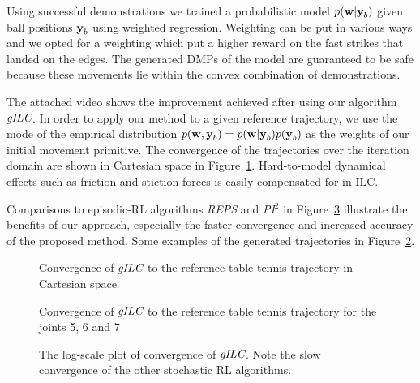 Using successful demonstrations we trained a probabilistic model $p(\boldsymbol{\mathrm{w}}|\boldsymbol{\mathrm{y}}_b)$ given ball positions $\boldsymbol{\mathrm{y}}_b$ using weighted regression. Weighting can be put in various ways and we opted for a weighting which put a higher reward on the fast strikes that landed on the edges. The generated DMPs of the model are guaranteed to be safe because these movements lie within the convex combination of demonstrations. 



The attached video shows the improvement achieved after using our algorithm $\emph{gILC}$. In order to apply our method to a given reference trajectory, we use the mode of the empirical distribution $p(\boldsymbol{\mathrm{w}},\boldsymbol{\mathrm{y}}_b) = p(\boldsymbol{\mathrm{w}}|\boldsymbol{\mathrm{y}}_b)p(\boldsymbol{\mathrm{y}}_b)$ as the weights of our initial movement primitive. The convergence of the trajectories over the iteration domain are shown in Cartesian space in Figure~\ref{ILCTrajectoryTTCartesian}. Hard-to-model dynamical effects such as friction and stiction forces is easily compensated for in ILC.

Comparisons to episodic-RL algorithms \emph{REPS} and \emph{PI$^{2}$} in Figure~\ref{ttComparison} illustrate the benefits of our approach, especially the faster convergence and increased accuracy of the proposed method. Some examples of the generated trajectories in Figure~\ref{ILCTrajectoryTT}. 

\begin{figure}
\center
\scalebox{1.0}{}
\caption{Convergence of $\emph{gILC}$ to the reference table tennis trajectory in Cartesian space.}
\label{ILCTrajectoryTTCartesian}
\end{figure}

\begin{figure}
\center
\scalebox{1.0}{}
\caption{Convergence of $\emph{gILC}$ to the reference table tennis trajectory for the joints 5, 6 and 7}
\label{ILCTrajectoryTT}
\end{figure}

\begin{figure}
\begingroup
\scalebox{0.5}{}
\endgroup
\caption{The log-scale plot of convergence of $\emph{gILC}$. Note the slow convergence of the other stochastic RL algorithms.}
\label{ttComparison}
\end{figure}